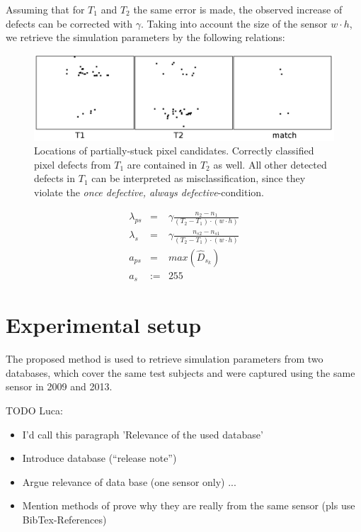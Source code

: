 \documentclass[10pt,twocolumn,letterpaper]{article}
\begin{document}
Assuming that for $T_1$ and $T_2$ the same error is made, the observed increase of defects can be corrected with $\gamma$. Taking into account the size of the sensor $w\cdot h$, we retrieve the simulation parameters by the following relations: 

\begin{figure}
  \centering
  \includegraphics[width=\linewidth]{img/detectedLocations.png}
  \caption{Locations of partially-stuck pixel candidates. Correctly classified pixel defects from $T_1$ are contained in $T_2$ as well. All other detected defects in $T_1$ can be interpreted as misclassification, since they violate the \emph{once defective, always defective}-condition.}
  \label{fig:defectPersistence}
\end{figure}


\begin{eqnarray}
 \lambda_{ps} 	& = 	& \gamma \frac{n_2-n_1}{(T_2-T_1)\cdot(w \cdot h)} \\ 
 \lambda_{s} 	& = 	& \gamma  \frac{n_{s2}-n_{s1}}{(T_2-T_1)\cdot(w \cdot h)} \\
 a_{ps} 	& = 	&max(\hat{D}_{s_k}) \\ 
 a_{s} 		&:= 	& 255
\end{eqnarray}



\section{Experimental setup}
 \label{testing}
 The proposed method is used to retrieve simulation parameters from two databases, which cover the same test subjects and were captured using the same sensor in 2009 and 2013.

TODO Luca:
\begin{itemize}
 \item I'd call this paragraph 'Relevance of the used database'
 \item Introduce database (``release note'')
 \item Argue relevance of data base (one sensor only) ... 
 \item Mention methods of prove why they are really from the same sensor (pls use BibTex-References)
\end{itemize}
\end{document}
